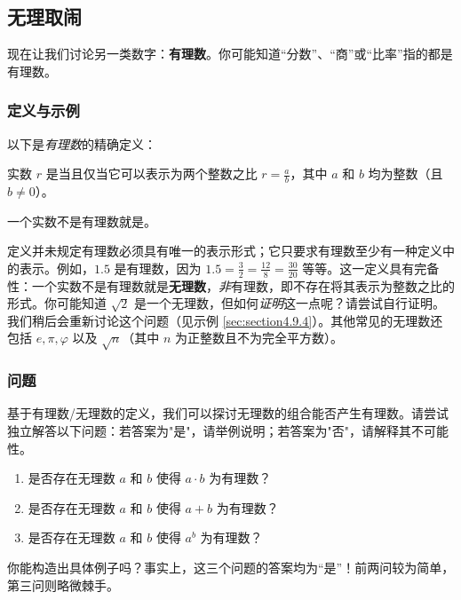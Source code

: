 \subsection{无理取闹}

现在让我们讨论另一类数字：\textbf{有理数}。你可能知道``分数''、``商''或``比率''指的都是有理数。

\subsubsection*{定义与示例}

以下是\emph{有理数}的精确定义：

\begin{definition}
    实数 $r$ 是当且仅当它可以表示为两个整数之比 $r = \frac{a}{b}$，其中 $a$ 和 $b$ 均为整数（且 $b \ne 0$）。

    一个实数不是有理数就是。
\end{definition}

定义并未规定有理数必须具有唯一的表示形式；它只要求有理数至少有一种定义中的表示。例如，$1.5$ 是有理数，因为 $1.5 = \frac{3}{2} = \frac{12}{8} = \frac{30}{20}$ 等等。这一定义具有完备性：一个实数不是有理数就是\textbf{无理数}，\emph{非}有理数，即不存在将其表示为整数之比的形式。你可能知道 $\sqrt{2}$ 是一个无理数，但如何\emph{证明}这一点呢？请尝试自行证明。我们稍后会重新讨论这个问题（见示例 \ref{sec:section4.9.4}）。其他常见的无理数还包括 $e, \pi, \varphi$ 以及 $\sqrt{n}$（其中 $n$ 为正整数且不为完全平方数）。

\subsubsection*{问题}

基于有理数/无理数的定义，我们可以探讨无理数的组合能否产生有理数。请尝试独立解答以下问题：若答案为"是"，请举例说明；若答案为"否"，请解释其不可能性。

\begin{enumerate}
    \item 是否存在无理数 $a$ 和 $b$ 使得 $a \cdot b$ 为有理数？
    \item 是否存在无理数 $a$ 和 $b$ 使得 $a + b$ 为有理数？
    \item 是否存在无理数 $a$ 和 $b$ 使得 $a^b$ 为有理数？
\end{enumerate}

你能构造出具体例子吗？事实上，这三个问题的答案均为``是''！前两问较为简单，第三问则略微棘手。

